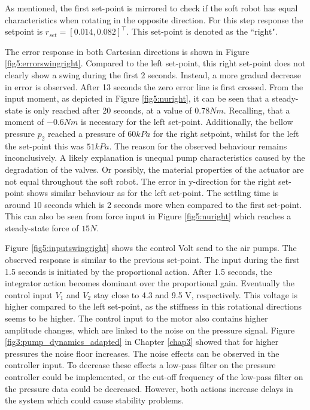 As mentioned, the first set-point is mirrored to check if the soft robot has equal characteristics when rotating in the opposite direction. For this step response the setpoint is $r_{set} = [0.014,0.082]^\top$. This set-point is denoted as the ``right".


The error response in both Cartesian directions is shown in Figure \ref{fig5:errorswingright}. Compared to the left set-point, this right set-point does not clearly show a swing during the first 2 seconds. Instead, a more gradual decrease in error is observed. After 13 seconds the zero error line is first crossed. From the input moment, as depicted in Figure \ref{fig5:nuright}, it can be seen that a steady-state is only reached after 20 seconds, at a value of $0.78 Nm$. Recalling, that a moment of $-0.6 Nm$ is necessary for the left set-point. Additionally, the bellow pressure $p_2$ reached a pressure of $60 kPa$ for the right setpoint, whilst for the left the set-point this was $51 kPa$. The reason for the observed behaviour remains inconclusively. A likely explanation is unequal pump characteristics caused by the degradation of the valves. Or possibly, the material properties of the actuator are not equal throughout the soft robot. The error in y-direction for the right set-point shows similar behaviour as for the left set-point. The settling time is around 10 seconds which is 2 seconds more when compared to the first set-point. This can also be seen from force input in Figure \ref{fig5:nuright} which reaches a steady-state force of $15 N$.

Figure \ref{fig5:inputswingright} shows the control Volt send to the air pumps. The observed response is similar to the previous set-point. The input during the first 1.5 seconds is initiated by the proportional action. After 1.5 seconds, the integrator action becomes dominant over the proportional gain. Eventually the control input $V_1$ and $V_2$ stay close to 4.3 and 9.5 V, respectively. This voltage is higher compared to the left set-point, as the stiffness in this rotational directions seems to be higher. The control input to the motor also contains higher amplitude changes, which are linked to the noise on the pressure signal. Figure \ref{fig3:pump_dynamics_adapted} in Chapter \ref{chap3} showed that for higher pressures the noise floor increases. The noise effects can be observed in the controller input. To decrease these effects a low-pass filter on the pressure controller could be implemented, or the cut-off frequency of the low-pass filter on the pressure data could be decreased. However, both actions increase delays in the system which could cause stability problems.

